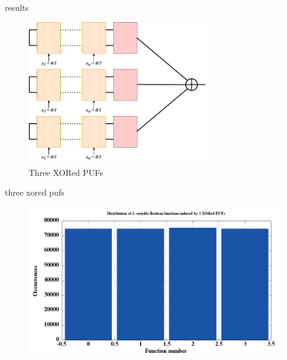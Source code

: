 \documentclass[10pt, compress]{beamer}
\begin{document}
\begin{frame}{results}
    \begin{figure}
        \centering
        \includegraphics[width=0.7\textwidth]{figures/puf_3_xor.pdf}
        \caption{Three XORed PUFs}
    \end{figure}
\end{frame}

\begin{frame}{three xored pufs}
    \begin{figure}
        \centering
        \includegraphics[width=\textwidth]{figures/dist/distribution_of_1-variable_boolean_functions_induced_by_3_xored_pufs.png}
    \end{figure}
\end{frame}
\end{document}
